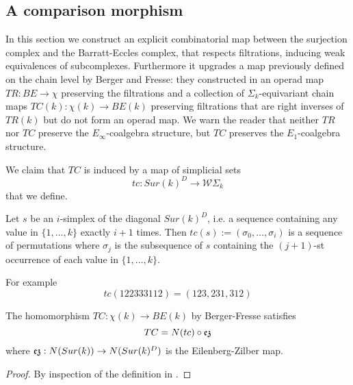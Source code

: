 \subsection{A comparison morphism}

In this section we construct an explicit combinatorial map between the surjection complex and the Barratt-Eccles complex, that respects filtrations, inducing weak equivalences of subcomplexes.
Furthermore it upgrades a map previously defined on the chain level by Berger and Fresse: they constructed in \cite{BFsmall}
an operad map $TR:BE \to \chi$ preserving the filtrations and a collection of $\Sigma_k$-equivariant
chain maps $TC(k):\chi(k) \to BE(k)$ preserving filtrations
that are right inverses of $TR(k)$ but do not form an operad map.
We warn the reader that neither $TR$ nor $TC$ preserve the $E_\infty$-coalgebra structure, but
$TC$ preserves the $E_1$-coalgebra structure.

We claim that $TC$ is induced by a map of simplicial sets
$$tc: Sur(k)^D \to \mathcal{W}\Sigma_k$$ that we define.
\begin{definition}
	Let $s$ be an $i$-simplex  of the diagonal $Sur(k)^D$, i.e. a sequence containing any value in $\{1,\dots,k\}$ exactly $i+1$ times.
	Then $tc(s):=(\sigma_0,\dots,\sigma_i)$ is a sequence of permutations where $\sigma_j$ is the subsequence of $s$ containing the $(j+1)$-st occurrence of each value in $\{1,\dots,k\}$.
\end{definition}

For example
$$tc(122333112)=(123,231,312)$$

\begin{proposition}
	The homomorphism $TC:\chi(k) \to BE(k)$ by Berger-Fresse satisfies
	$$TC=N(tc) \circ \operatorname{\mathfrak{ez}}$$ where $\operatorname{\mathfrak{ez}}:N(Sur(k)) \to
	N(Sur(k)^D)$ is the Eilenberg-Zilber map.
\end{proposition}

\begin{proof}
	By inspection of the definition in \cite{BFsmall}.%
\end{proof}



